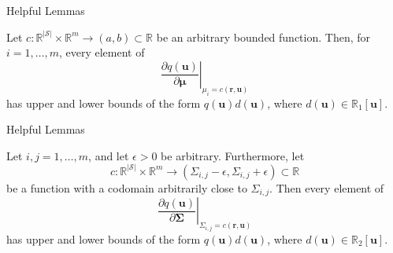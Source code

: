 \documentclass{beamer}
\begin{document}
\begin{frame}{Helpful Lemmas}
  \begin{lemma}
    Let $c : \mathbb{R}^{|\mathcal{S}|} \times \mathbb{R}^m \to (a, b) \subset
    \mathbb{R}$ be an arbitrary bounded function. Then, for $i = 1, \dots, m$,
    every element of
    \[
      \left. \frac{\partial q(\mathbf{u})}{\partial \bm\mu} \right|_{\mu_i =
        c(\mathbf{r}, \mathbf{u})}
    \]
    has upper and lower bounds of the form $q(\mathbf{u})d(\mathbf{u})$,
    where $d(\mathbf{u}) \in \mathbb{R}_1[\mathbf{u}]$.
  \end{lemma}
\end{frame}

\begin{frame}{Helpful Lemmas}
  \begin{lemma} \label{lemma:bound3}
    Let $i, j = 1, \dots, m$, and let $\epsilon > 0$ be arbitrary. Furthermore,
    let
    \[
      c : \mathbb{R}^{|\mathcal{S}|} \times \mathbb{R}^m \to (\Sigma_{i,j} - \epsilon,
      \Sigma_{i,j} + \epsilon) \subset \mathbb{R}
    \]
    be a function with a codomain arbitrarily close to $\Sigma_{i,j}$. Then every
    element of
    \[
      \left. \frac{\partial q(\mathbf{u})}{\partial \bm\Sigma} \right|_{\Sigma_{i,j} =
        c(\mathbf{r}, \mathbf{u})}
    \]
    has upper and lower bounds of the form $q(\mathbf{u})d(\mathbf{u})$, where
    $d(\mathbf{u}) \in \mathbb{R}_2[\mathbf{u}]$.
  \end{lemma}
\end{frame}

\end{document}
